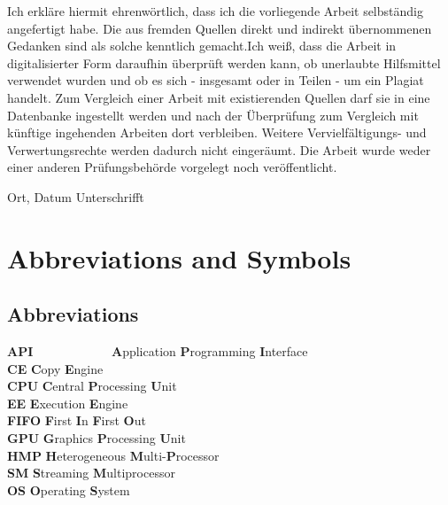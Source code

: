 \documentclass[
  12pt,
  a4paperpaper,
]{report}
\begin{document}
Ich erkläre hiermit ehrenwörtlich, dass ich die vorliegende Arbeit
selbständig angefertigt habe. Die aus fremden Quellen direkt und
indirekt übernommenen Gedanken sind als solche kenntlich gemacht.Ich
weiß, dass die Arbeit in digitalisierter Form daraufhin überprüft werden
kann, ob unerlaubte Hilfsmittel verwendet wurden und ob es sich -
insgesamt oder in Teilen - um ein Plagiat handelt. Zum Vergleich einer
Arbeit mit existierenden Quellen darf sie in eine Datenbanke ingestellt
werden und nach der Überprüfung zum Vergleich mit künftige ingehenden
Arbeiten dort verbleiben. Weitere Vervielfältigungs- und
Verwertungsrechte werden dadurch nicht eingeräumt. Die Arbeit wurde
weder einer anderen Prüfungsbehörde vorgelegt noch veröffentlicht.

Ort, Datum
\quad\quad\quad\quad\quad\quad\quad\quad\quad\quad\quad\quad\quad\quad  Unterschrifft

\newpage


\tableofcontents
\setcounter{tocdepth}{1}
\listoffigures
\listoftables

\newpage

\hypertarget{abbreviations-and-symbols}{%
\chapter*{Abbreviations and Symbols}\label{abbreviations-and-symbols}}

\hypertarget{abbreviations}{%
\section*{Abbreviations}\label{abbreviations}}

\begin{tabbing}
\textbf{API}~~~~~~~~~~~~ \= \textbf{A}pplication \textbf{P}rogramming \textbf{I}nterface \\
\textbf{CE} \> \textbf{C}opy \textbf{E}ngine \\
\textbf{CPU} \> \textbf{C}entral \textbf{P}rocessing \textbf{U}nit \\
\textbf{EE} \> \textbf{E}xecution \textbf{E}ngine \\
\textbf{FIFO} \> \textbf{F}irst \textbf{I}n \textbf{F}irst \textbf{O}ut \\
\textbf{GPU} \> \textbf{G}raphics \textbf{P}rocessing \textbf{U}nit \\  
\textbf{HMP} \> \textbf{H}eterogeneous \textbf{M}ulti-\textbf{P}rocessor \\  
\textbf{SM} \> \textbf{S}treaming \textbf{M}ultiprocessor \\  
\textbf{OS} \> \textbf{O}perating \textbf{S}ystem \\
\end{tabbing}
\end{document}
